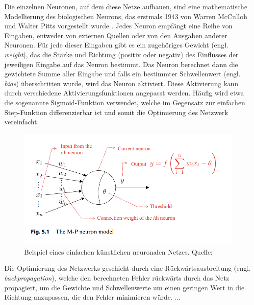 
Die einzelnen Neuronen, auf dem diese Netze aufbauen, sind eine mathematische Modellierung des biologischen Neurons, das erstmals 1943 von Warren McCulloh und Walter Pitts vorgestellt wurde \parencite{Zhou2021}. Jedes Neuron empfängt eine Reihe von Eingaben, entweder von externen Quellen oder von den Ausgaben anderer Neuronen. Für jede dieser Eingaben gibt es ein zugehöriges Gewicht (engl. \textit{weight}), das die Stärke und Richtung (positiv oder negativ) des Einflusses der jeweiligen Eingabe auf das Neuron bestimmt. Das Neuron berechnet dann die gewichtete Summe aller Eingabe und falls ein bestimmter Schwellenwert (engl. \textit{bias}) überschritten wurde, wird das Neuron aktiviert. Diese Aktivierung kann durch verschiedene Aktivierungsfunktionen angepasst werden. Häufig wird etwa die sogenannte Sigmoid-Funktion verwendet, welche im Gegensatz zur einfachen Step-Funktion differenzierbar ist und somit die Optimierung des Netzwerk vereinfacht.

\begin{figure}[] \label{figure-neuron}
	\includegraphics[]{figure_neural_network.png}
	\caption{Beispiel eines einfachen künstlichen neuronalen Netzes. Quelle: \parencite{Zhou2021}}
\end{figure}

Die Optimierung des Netzwerks geschieht durch eine Rückwärtsausbreitung (engl. \textit{backpropagation}), welche den berechneten Fehler rückwärts durch das Netz propagiert, um die Gewichte und Schwellenwerte um einen geringen Wert in die Richtung anzupassen, die den Fehler minimieren würde. ...


